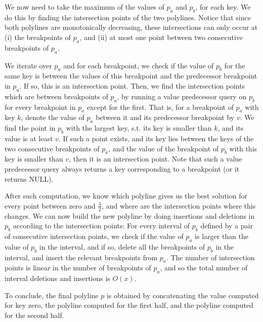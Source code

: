 \documentclass[11pt,a4paper]{article}
\theoremstyle{definition}
\theoremstyle{remark}
\begin{document}
We now need to take the maximum of the values of $p_a$ and $p_b$, for each key. We do this by finding the intersection points of the two polylines. Notice that since both polylines are monotonically decreasing, these intersections can only occur at (i) the breakpoints of $p_a$, and (ii) at most one point between two consecutive breakpoints of $p_a$.

We iterate over $p_a$ and for each breakpoint, we check if the value of $p_b$ for the same key is between the values of this breakpoint and the predecessor breakpoint in $p_a$. If so, this is an intersection point. Then, we find the intersection points which are between breakpoints of $p_a$, by running a value predecessor query on $p_b$ for every breakpoint in $p_a$ except for the first. That is, for a breakpoint of $p_a$ with key $k$, denote the value of $p_a$ between it and its predecessor breakpoint by $v$. We find the point in $p_b$ with the largest key, s.t. its key is smaller than $k$, and its value is at least $v$. If such a point exists, and its key lies between the keys of the two consecutive breakpoints of $p_a$, and the value of the breakpoint of $p_b$ with this key is smaller than $v$, then it is an intersection point. Note that such a value predecessor query always returns a key corresponding to a breakpoint (or it returns NULL).

After such computation, we know which polyline gives us the best solution for every point between zero and $\frac{\lambda}{2}$, and where are the intersection points where this changes. We can now build the new polyline by doing insertions and deletions in $p_b$ according to the intersection points: For every interval of $p_b$ defined by a pair of consecutive intersection points, we check if the value of $p_a$ is larger than the value of $p_b$ in the interval, and if so, delete all the breakpoints of $p_b$ in the interval, and insert the relevant breakpoints from $p_a$. The number of intersection points is linear in the number of breakpoints of $p_a$, and so the total number of interval deletions and insertions is $O(x)$.

To conclude, the final polyline $p$ is obtained by concatenating the value computed for key zero, the polyline computed for the first half, and the polyline computed for the second half. 
\end{document}
